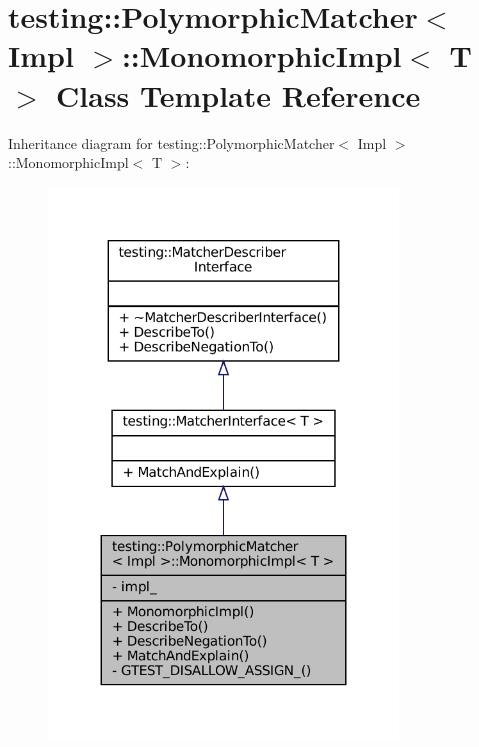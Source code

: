 \hypertarget{classtesting_1_1PolymorphicMatcher_1_1MonomorphicImpl}{}\section{testing\+:\+:Polymorphic\+Matcher$<$ Impl $>$\+:\+:Monomorphic\+Impl$<$ T $>$ Class Template Reference}
\label{classtesting_1_1PolymorphicMatcher_1_1MonomorphicImpl}


Inheritance diagram for testing\+:\+:Polymorphic\+Matcher$<$ Impl $>$\+:\+:Monomorphic\+Impl$<$ T $>$\+:
\nopagebreak
\begin{figure}[H]
\begin{center}
\leavevmode
\includegraphics[width=263pt]{classtesting_1_1PolymorphicMatcher_1_1MonomorphicImpl__inherit__graph}
\end{center}
\end{figure}


